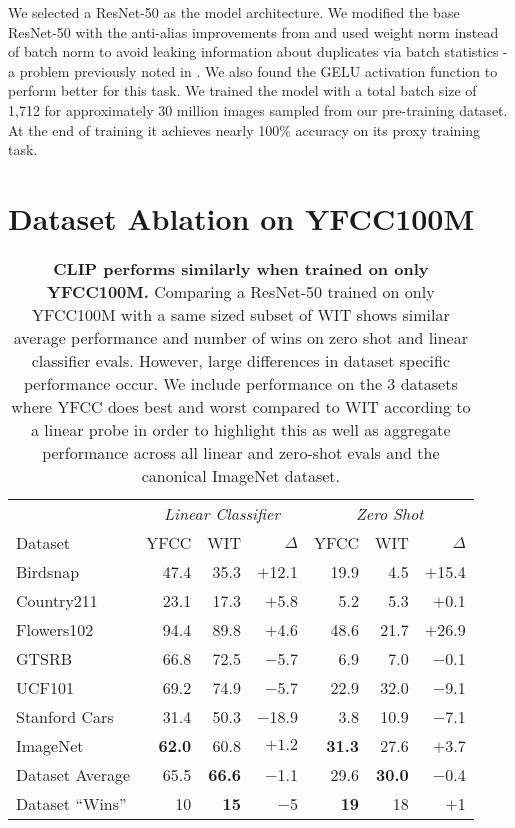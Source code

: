 \documentclass{article}
\begin{document}
We selected a ResNet-50 as the model architecture. We modified the base ResNet-50 with the anti-alias improvements from \cite{zhang2019making} and used weight norm \cite{salimans2016weight} instead of batch norm \citep{ioffe2015batch} to avoid leaking information about duplicates via batch statistics - a problem previously noted in \cite{henaff2020data}. We also found the GELU activation function \citep{hendrycks2016gaussian} to perform better for this task. We trained the model with a total batch size of 1,712 for approximately 30 million images sampled from our pre-training dataset. At the end of training it achieves nearly 100\% accuracy on its proxy training task.

\section{Dataset Ablation on YFCC100M}

\begin{table}[t]
\vskip 0.15in
\scriptsize
\begin{center}
\begin{tabular}{l|rrr|rrr}
\toprule
& \multicolumn{3}{c}{\textit{Linear Classifier}} & \multicolumn{3}{c}{\textit{Zero Shot}} \\
Dataset & YFCC & WIT & $\Delta$ & YFCC & WIT & $\Delta$ \\
\midrule
Birdsnap      & 47.4 & 35.3 & $+$12.1 & 19.9 &  4.5 & $+$15.4 \\
Country211    & 23.1 & 17.3 &  $+$5.8 &  5.2 &  5.3 &  $+$0.1 \\
Flowers102    & 94.4 & 89.8 &  $+$4.6 & 48.6 & 21.7 & $+$26.9 \\
GTSRB         & 66.8 & 72.5 &  $-$5.7 &  6.9 &  7.0 &  $-$0.1 \\
UCF101        & 69.2 & 74.9 &  $-$5.7 & 22.9 & 32.0 &  $-$9.1 \\
Stanford Cars & 31.4 & 50.3 & $-$18.9 &  3.8 & 10.9 &  $-$7.1 \\
\midrule
ImageNet & \textbf{62.0} & 60.8 & $+1.2$ & \textbf{31.3} & 27.6 & $+$3.7 \\
Dataset Average  & 65.5 & \textbf{66.6} & $-$1.1 & 29.6 & \textbf{30.0} & $-$0.4 \\
Dataset ``Wins'' & 10 & \textbf{15} & $-$5 & \textbf{19} & 18 & $+$1 \\
\bottomrule
\end{tabular}
\caption{\textbf{CLIP performs similarly when trained on only YFCC100M.} Comparing a ResNet-50 trained on only YFCC100M with a same sized subset of WIT shows similar average performance and number of wins on zero shot and linear classifier evals. However, large differences in dataset specific performance occur. We include performance on the 3 datasets where YFCC does best and worst compared to WIT according to a linear probe in order to highlight this as well as aggregate performance across all linear and zero-shot evals and the canonical ImageNet dataset.}
\label{dataset_ablation_table}
\end{center}
\vskip -0.1in
\end{table}
\end{document}
